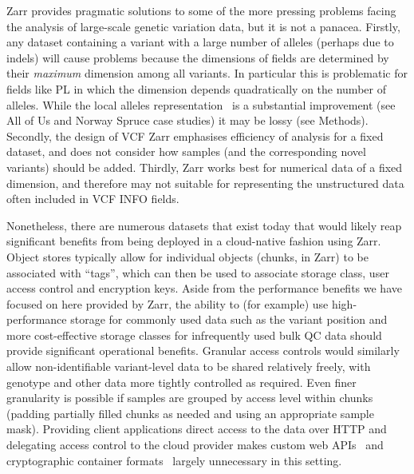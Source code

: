 \documentclass[a4paper,num-refs]{oup-contemporary}
\begin{document}
Zarr provides pragmatic solutions to some of the more pressing
problems facing the analysis of large-scale genetic variation
data, but it is not a panacea. Firstly,
any dataset containing a variant with a large number of alleles
(perhaps due to indels) will cause problems because the
dimensions of fields are determined by their \emph{maximum}
dimension among all variants. In particular this is problematic
for fields like PL in which the dimension depends
quadratically on the number of alleles.
While the local alleles representation~\cite{poterba2025scalable}
is a substantial improvement (see All of Us and Norway Spruce
case studies) it may be lossy (see Methods). 
Secondly, the design of
VCF Zarr emphasises efficiency of analysis for a fixed
dataset, and does not consider how samples (and the
corresponding novel variants) should be added.
Thirdly, Zarr works best for numerical data of a fixed
dimension, and therefore may not suitable for representing
the unstructured data often included in VCF INFO fields.

Nonetheless, there are numerous datasets that exist today
that would likely reap significant benefits from being deployed
in a cloud-native fashion using Zarr. Object
stores typically allow for individual objects (chunks, in
Zarr) to be associated with ``tags'', which can then be
used to associate storage class, user access control
and encryption keys.
Aside from the performance benefits
we have focused on here provided by Zarr, the ability
to (for example) use high-performance storage for commonly
used data such as the variant position and
more cost-effective storage classes
for infrequently used bulk QC data should provide
significant operational benefits.
Granular access controls would similarly allow non-identifiable
variant-level data to be shared relatively freely,
with genotype and other data more tightly controlled
as required.
Even finer granularity is possible if samples are grouped by
access level within chunks (padding partially filled
chunks as needed and using an appropriate sample mask).
Providing client applications direct access to
the data over HTTP
and delegating access control to the cloud provider
makes custom web APIs~\cite{kelleher2019htsget}
and cryptographic container formats~\citep{senf2021crypt4gh}
largely unnecessary in this setting.
\end{document}
